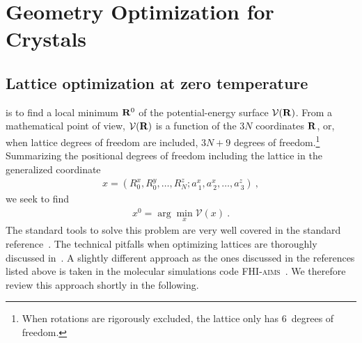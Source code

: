 
\newpage

\section{Geometry Optimization for Crystals}
\subsection{Lattice optimization at zero temperature}
 is to find a local minimum ${\bf R}^0$ of the potential-energy surface $\mathcal{V} ({\bf R})$. From a mathematical point of view, $\mathcal V ({\bf R})$ is a function of the $3N$ coordinates ${\bf R}$, or, when lattice degrees of freedom are included, $3N + 9$ degrees of freedom.\footnote{When rotations are rigorously excluded, the lattice only has 6~degrees of freedom.} Summarizing the positional degrees of freedom including the lattice in the generalized coordinate
\begin{align}
x 
= \left( R_{0}^x, R_{0}^y, \ldots, R_{N}^z; a^x_{~1}, a^x_{~2}, \ldots, a^z_{~3} \right) ~,
\label{eq:opt.x}
\end{align}
we seek to find
\begin{align}
x^0 = \arg \min_x \mathcal V (x)~.
\end{align}
The standard tools to solve this problem are very well covered in the standard reference~\cite{nocedal2006}. The technical pitfalls when optimizing lattices are thoroughly discussed in~\cite{pfrommer1997,Tadmor1999}.
A slightly different approach as the ones discussed in the references listed above is taken in the molecular simulations code \textsc{FHI-aims}~\cite{FHI-aims}. We therefore review this approach shortly in the following.

